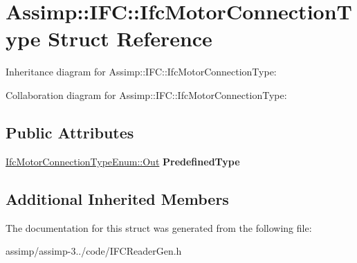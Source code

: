 \hypertarget{struct_assimp_1_1_i_f_c_1_1_ifc_motor_connection_type}{\section{Assimp\+:\+:I\+F\+C\+:\+:Ifc\+Motor\+Connection\+Type Struct Reference}
\label{struct_assimp_1_1_i_f_c_1_1_ifc_motor_connection_type}
}


Inheritance diagram for Assimp\+:\+:I\+F\+C\+:\+:Ifc\+Motor\+Connection\+Type\+:


Collaboration diagram for Assimp\+:\+:I\+F\+C\+:\+:Ifc\+Motor\+Connection\+Type\+:
\subsection*{Public Attributes}
\begin{DoxyCompactItemize}
\item 
\hypertarget{struct_assimp_1_1_i_f_c_1_1_ifc_motor_connection_type_aef40510bd36d8b88227590d70cc4d314}{\hyperlink{classboost_1_1shared__ptr}{Ifc\+Motor\+Connection\+Type\+Enum\+::\+Out} {\bfseries Predefined\+Type}}\label{struct_assimp_1_1_i_f_c_1_1_ifc_motor_connection_type_aef40510bd36d8b88227590d70cc4d314}

\end{DoxyCompactItemize}
\subsection*{Additional Inherited Members}


The documentation for this struct was generated from the following file\+:\begin{DoxyCompactItemize}
\item 
assimp/assimp-\/3../code/I\+F\+C\+Reader\+Gen.\+h\end{DoxyCompactItemize}
